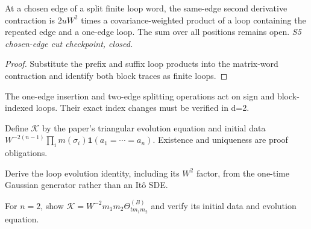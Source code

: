 \begin{lemma}
  \label{lem:loop-contraction-second-same-edge-cut}
  \leanok
  At a chosen edge of a split finite loop word, the same-edge second
  derivative contraction is $2uW^2$ times a covariance-weighted product of
  a loop containing the repeated edge and a one-edge loop. The sum over all
  positions remains open. \emph{S5 chosen-edge cut checkpoint, closed.}
\end{lemma}
\begin{proof}\leanok
  Substitute the prefix and suffix loop products into the matrix-word
  contraction and identify both block traces as finite loops.
\end{proof}

\begin{definition}\label{def:loop-ops}
  The one-edge insertion and two-edge splitting operations act on sign and
  block-indexed loops.  Their exact index changes must be verified in d=2.
\end{definition}

\begin{definition}\label{def:ktree}
  Define $\mathcal K$ by the paper's triangular evolution equation and initial
  data $W^{-2(n-1)}\prod_i m(\sigma_i)\mathbf 1(a_1=\cdots=a_n)$.
  Existence and uniqueness are proof obligations.
\end{definition}

\begin{lemma}\label{lem:loop-hierarchy}
  Derive the loop evolution identity, including its $W^2$ factor, from the
  one-time Gaussian generator rather than an It\^o SDE.
\end{lemma}

\begin{lemma}\label{lem:ktree2}
  For $n=2$, show $\mathcal K=W^{-2}m_1m_2\Theta^{(B)}_{tm_1m_2}$ and verify
  its initial data and evolution equation.
\end{lemma}

